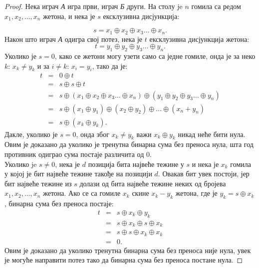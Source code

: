 \documentclass[a4paper]{article}
\begin{document}
\begin{proof}
	Нека играч \textit{А} игра први, играч \textit{Б} други. На столу je $ n $ гомила са редом $ x_{1}, x_{2}, \ldots , x_{n} $ жетона, и нека је $ s $ ексклузивна дисјункција: 
	
	\begin{displaymath}
		s = x_{1} \oplus x_{2} \oplus x_{3} \ldots \oplus x_{n}.
	\end{displaymath}	
	Након што играч \textit{А} одигра свој потез, нека је $ t $ ексклузивна дисјункција жетона:
	\begin{displaymath}
		t = y_{1} \oplus y_{2} \oplus y_{3} \ldots \oplus y_{n}.
	\end{displaymath}
	 Уколико је $ s = 0 $, како се жетони могу узети само са једне гомиле, онда је за неко $ k $: $ x_{k} \neq y_{k} $ и за $ i \neq k $: $ x_{i} = y_{i} $, тако да је:	 
	 \begin{eqnarray*}
	 	t &=& 0 \oplus t \\
		  &=& s \oplus s \oplus t \\
		  &=& s \oplus (x_{1} \oplus x_{2} \oplus x_{3} \ldots \oplus x_{n}) \oplus (y_{1} \oplus y_{2} \oplus y_{3} \ldots \oplus y_{n}) \\
		  &=& s \oplus (x_{1} \oplus y_{1}) \oplus (x_{2} \oplus y_{2}) \oplus  \ldots \oplus (x_{n} + y_{n}) \\
		  &=& s \oplus (x_{k} \oplus y_{k}). 		 
	 \end{eqnarray*}
	 Дакле, уколико је $ s = 0 $, онда због $ x_{k} \neq y_{k} $ важи $ x_{k} \oplus y_{k} $ никад неће бити нула. Овим је доказано да уколико је тренутна бинарна сума без преноса нула, шта год противник одиграо сума постаје различита од $ 0 $.\\	 
	 Уколико je $ s \neq 0 $, нека је $ d $ позиција бита највеће тежине у $ s $ и нека је $ x_{k} $ гомила у којој је бит највеће тежине такође на позицији $ d $. Овакав бит увек постоји, јер бит највеће тежине из $ s $ долази од бита највеће тежине неких од бројева $ x_{1}, x_{2}, \ldots , x_{n} $ жетона. Ако се са гомиле $ x_{k} $ скине $ x_{k} - y_{k} $ жетона, где је $ y_{k} = s \oplus x_{k} $, бинарна сума без преноса постаје:
	 \begin{eqnarray*}
	 	t &=& s \oplus x_{k} \oplus y_{k} \\ 
	 	&=& s \oplus x_{k} \oplus s \oplus x_{k} \\
	 	&=& s \oplus s \oplus x_{k} \oplus x_{k} \\
	 	&=& 0.	 
	 \end{eqnarray*}	 
	 Овим је доказано да уколико тренутна бинарна сума без преноса није нула, увек је могуће направити потез тако да бинарна сума без преноса постане нула.
\end{proof}
\end{document}
